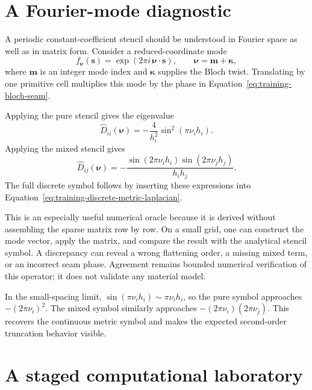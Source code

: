 \section{A Fourier-mode diagnostic}

A periodic constant-coefficient stencil should be understood in Fourier space
as well as in matrix form. Consider a reduced-coordinate mode
\begin{equation}
  f_{\boldsymbol\nu}(\mathbf s)
  =\exp\!\left(2\pi i\,\boldsymbol\nu\cdot\mathbf s\right),
  \qquad
  \boldsymbol\nu=\mathbf m+\boldsymbol\kappa,
  \label{eq:training-discrete-bloch-mode}
\end{equation}
where $\mathbf m$ is an integer mode index and $\boldsymbol\kappa$ supplies the
Bloch twist. Translating by one primitive cell multiplies this mode by the
phase in Equation~\eqref{eq:training-bloch-seam}.

Applying the pure stencil gives the eigenvalue
\begin{equation}
  \widehat D_{ii}(\boldsymbol\nu)
  =-\frac{4}{h_i^2}
  \sin^2\!\left(\pi\nu_i h_i\right).
  \label{eq:training-pure-difference-symbol}
\end{equation}
Applying the mixed stencil gives
\begin{equation}
  \widehat D_{ij}(\boldsymbol\nu)
  =-\frac{
    \sin\!\left(2\pi\nu_i h_i\right)
    \sin\!\left(2\pi\nu_j h_j\right)}
  {h_i h_j}.
  \label{eq:training-mixed-difference-symbol}
\end{equation}
The full discrete symbol follows by inserting these expressions into
Equation~\eqref{eq:training-discrete-metric-laplacian}.

This is an especially useful numerical oracle because it is derived without
assembling the sparse matrix row by row. On a small grid, one can construct the
mode vector, apply the matrix, and compare the result with the analytical
stencil symbol. A discrepancy can reveal a wrong flattening order, a missing
mixed term, or an incorrect seam phase. Agreement remains bounded numerical
verification of this operator; it does not validate any material model.

In the small-spacing limit,
$\sin(\pi\nu_i h_i)\sim\pi\nu_i h_i$, so the pure symbol approaches
$-(2\pi\nu_i)^2$. The mixed symbol similarly approaches
$-(2\pi\nu_i)(2\pi\nu_j)$. This recovers the continuous metric symbol and makes
the expected second-order truncation behavior visible.

\section{A staged computational laboratory}

